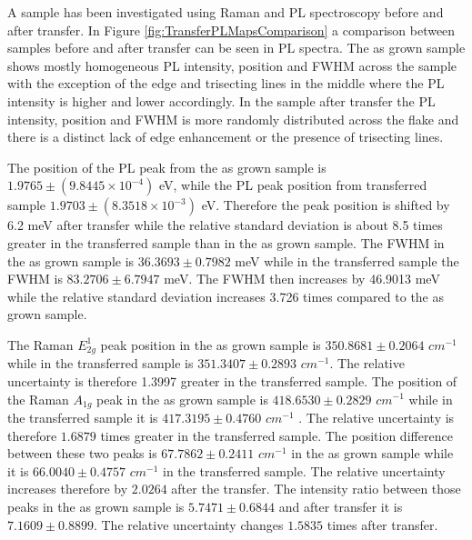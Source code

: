 	A sample has been investigated using Raman and PL spectroscopy before and after transfer. In Figure \ref{fig:TransferPLMapsComparison} a comparison between samples before and after transfer can be seen in PL spectra. The as grown sample shows mostly homogeneous PL intensity, position and FWHM across the sample with the exception of the edge and trisecting lines in the middle where the PL intensity is higher and lower accordingly. In the sample after transfer the PL intensity, position and FWHM is more randomly distributed across the flake and there is a distinct lack of edge enhancement or the presence of trisecting lines.
	
	The position of the PL peak from the as grown sample is $1.9765 \pm (9.8445 \times 10^{-4})$ eV, while the PL peak position from transferred sample $1.9703 \pm (8.3518 \times 10^{-3})$ eV. Therefore the peak position is shifted by 6.2 meV after transfer while the relative standard deviation is about 8.5 times greater in the transferred sample than in the as grown sample. The FWHM in the as grown sample is $36.3693 \pm 0.7982$ meV while in the transferred sample the FWHM is $83.2706 \pm 6.7947$ meV. The FWHM then increases by 46.9013 meV while the relative standard deviation increases 3.726 times compared to the as grown sample.

	The Raman $E^1_{2g}$ peak position in the as grown sample is $350.8681 \pm 0.2064$ $cm^{-1}$ while in the transferred sample is $351.3407 \pm 0.2893$ $cm^{-1}$. The relative uncertainty is therefore 1.3997 greater in the transferred sample. The position of the Raman $A_{1g}$ peak in the as grown sample is $418.6530 \pm 0.2829$ $cm^{-1}$ while in the transferred sample it is $417.3195 \pm 0.4760$ $cm^{-1}$ . The relative uncertainty is therefore $1.6879$ times greater in the transferred sample. The position difference between these two peaks is $67.7862 \pm 0.2411$ $cm^{-1}$ in the as grown sample while it is $66.0040 \pm 0.4757$ $cm^{-1}$ in the transferred sample. The relative uncertainty increases therefore by $2.0264$ after the transfer. The intensity ratio between those peaks in the as grown sample is $5.7471 \pm 0.6844$ and after transfer it is $7.1609 \pm 0.8899$. The relative uncertainty changes $1.5835$ times after transfer.
	
